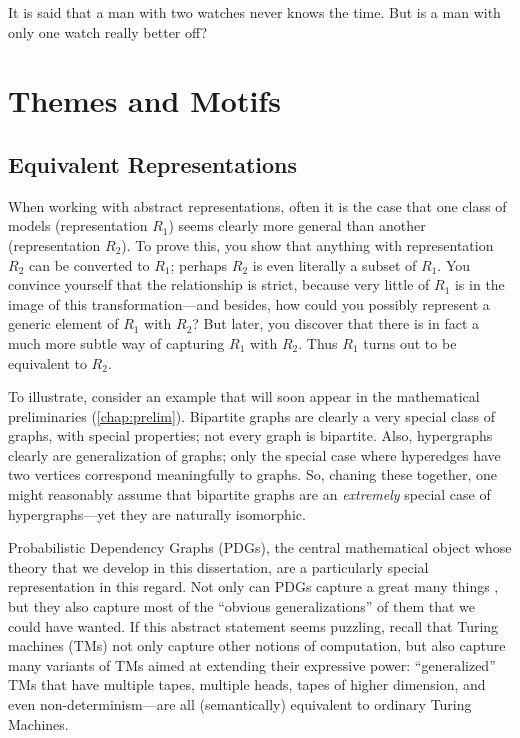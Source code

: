 %
It is said that a man with two watches never knows the time.  
But is a man with only one watch really better off?


\section{Themes and Motifs}
%
\subsection{Equivalent Representations}

When working with abstract representations, often it is the case that one class of models (representation $R_1$) seems clearly more general than another (representation $R_2$).
To prove this, you show that anything with representation $R_2$ can be converted to $R_1$; perhaps $R_2$ is even literally a subset of $R_1$. 
You convince yourself that the relationship is strict, because very little of $R_1$ is in the image of this transformation---and besides, how could you possibly represent a generic element of $R_1$ with $R_2$? 
But later, you discover that there is in fact a much more subtle way of capturing $R_1$ with $R_2$. 
Thus $R_1$ turns out to be equivalent to $R_2$. 

To illustrate, consider an example that will soon appear in the mathematical preliminaries (\cref{chap:prelim}). 
Bipartite graphs are clearly a very special class of graphs, with special properties; not every graph is bipartite. 
Also, hypergraphs clearly are generalization of graphs; only the special case where hyperedges have two vertices correspond meaningfully to graphs. 
So, chaning these together, one might reasonably assume that bipartite graphs are an \emph{extremely} special case of hypergraphs---yet they are naturally isomorphic. 


Probabilistic Dependency Graphs (PDGs), the central mathematical object whose theory that we develop in this dissertation, are a particularly special representation in this regard. 
Not only can PDGs capture a great many things 
\unskip, but they also capture most of the ``obvious generalizations'' of them that we could have wanted. 
If this abstract statement seems puzzling, recall that Turing machines (TMs) not only capture other notions of computation, but also capture many variants of TMs aimed at extending their expressive power: ``generalized'' TMs that have multiple tapes, multiple heads, tapes of higher dimension, and even non-determinism---are all (semantically) equivalent to ordinary Turing Machines. 


